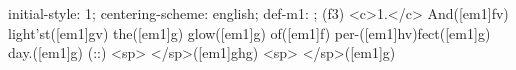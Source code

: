 initial-style: 1;
centering-scheme: english;
def-m1: \grealign;
(f3) <c>1.</c> And([em1]fv) light'st([em1]gv) the([em1]g) glow([em1]g) of([em1]f) per-([em1]hv)fect([em1]g) day.([em1]g) (::) <sp> </sp>([em1]ghg) <sp>   </sp>([em1]g)